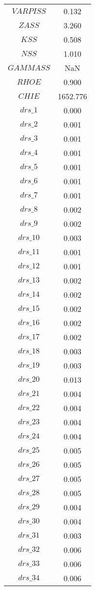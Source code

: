 \begin{center}
\begin{longtable}{cc}
$VARPISS$ 	 & 	 0.132 \\
$ZASS$ 	 & 	 3.260 \\
$KSS$ 	 & 	 0.508 \\
$NSS$ 	 & 	 1.010 \\
$GAMMASS$ 	 & 	  NaN \\
$RHOE$ 	 & 	 0.900 \\
$CHIE$ 	 & 	 1652.776 \\
$drs\_1$ 	 & 	 0.000 \\
$drs\_2$ 	 & 	 0.001 \\
$drs\_3$ 	 & 	 0.001 \\
$drs\_4$ 	 & 	 0.001 \\
$drs\_5$ 	 & 	 0.001 \\
$drs\_6$ 	 & 	 0.001 \\
$drs\_7$ 	 & 	 0.001 \\
$drs\_8$ 	 & 	 0.002 \\
$drs\_9$ 	 & 	 0.002 \\
$drs\_10$ 	 & 	 0.003 \\
$drs\_11$ 	 & 	 0.001 \\
$drs\_12$ 	 & 	 0.001 \\
$drs\_13$ 	 & 	 0.002 \\
$drs\_14$ 	 & 	 0.002 \\
$drs\_15$ 	 & 	 0.002 \\
$drs\_16$ 	 & 	 0.002 \\
$drs\_17$ 	 & 	 0.002 \\
$drs\_18$ 	 & 	 0.003 \\
$drs\_19$ 	 & 	 0.003 \\
$drs\_20$ 	 & 	 0.013 \\
$drs\_21$ 	 & 	 0.004 \\
$drs\_22$ 	 & 	 0.004 \\
$drs\_23$ 	 & 	 0.004 \\
$drs\_24$ 	 & 	 0.004 \\
$drs\_25$ 	 & 	 0.005 \\
$drs\_26$ 	 & 	 0.005 \\
$drs\_27$ 	 & 	 0.005 \\
$drs\_28$ 	 & 	 0.005 \\
$drs\_29$ 	 & 	 0.004 \\
$drs\_30$ 	 & 	 0.004 \\
$drs\_31$ 	 & 	 0.003 \\
$drs\_32$ 	 & 	 0.006 \\
$drs\_33$ 	 & 	 0.006 \\
$drs\_34$ 	 & 	 0.006 \\

\end{longtable}
\end{center}

